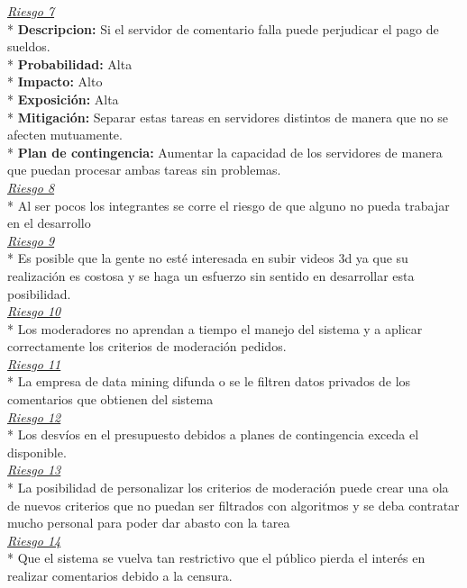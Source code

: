 \newline
\uline{\it{Riesgo 7}}\\*
{\bf{Descripcion:}} Si el servidor de comentario falla puede perjudicar el pago de sueldos.\\*
{\bf{Probabilidad:}} Alta\\*
{\bf{Impacto:}} Alto\\*
{\bf{Exposición:}} Alta\\*
{\bf{Mitigación:}} Separar estas tareas en servidores distintos de manera que no se afecten mutuamente.\\*
{\bf{Plan de contingencia:}} Aumentar la capacidad de los servidores de manera que puedan procesar ambas tareas sin problemas.\\
\newline
\uline{\it{Riesgo 8}}\\*
Al ser pocos los integrantes se corre el riesgo de que alguno no pueda trabajar en el desarrollo\\
\newline
\uline{\it{Riesgo 9}}\\*
Es posible que la gente no esté interesada en subir videos 3d ya que su realización es costosa y se haga un esfuerzo sin sentido en desarrollar esta posibilidad.\\
\newline
\uline{\it{Riesgo 10}}\\*
Los moderadores no aprendan a tiempo el manejo del sistema y a aplicar correctamente los criterios de moderación pedidos.\\
\newline
\uline{\it{Riesgo 11}}\\*
La empresa de data mining difunda o se le filtren datos privados de los comentarios que obtienen del sistema\\
\newline
\uline{\it{Riesgo 12}}\\*
Los desvíos en el presupuesto debidos a planes de contingencia exceda el disponible.\\
\newline
\uline{\it{Riesgo 13}}\\*
La posibilidad de personalizar los criterios de moderación puede crear una ola de nuevos criterios que no puedan ser filtrados con algoritmos y se deba contratar mucho personal para poder dar abasto con la tarea\\
\newline
\uline{\it{Riesgo 14}}\\*
Que el sistema se vuelva tan restrictivo que el público pierda el interés en realizar comentarios debido a la censura.\\


